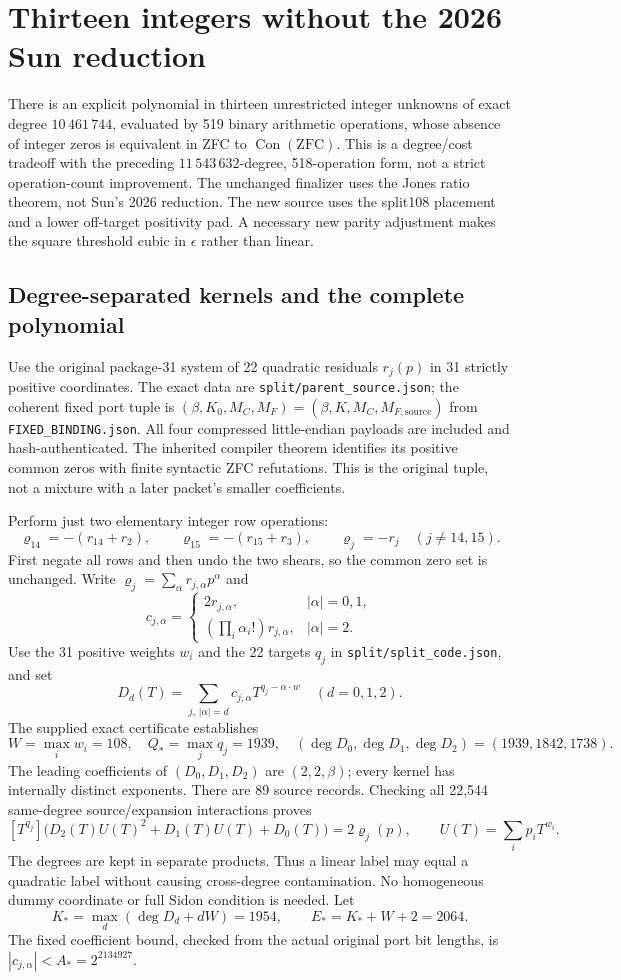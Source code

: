 \section{Thirteen integers without the 2026 Sun reduction}
There is an explicit polynomial in thirteen unrestricted integer unknowns of exact degree $10\,461\,744$, evaluated by 519 binary arithmetic operations, whose absence of integer zeros is equivalent in ZFC to $\operatorname{Con}(\mathrm{ZFC})$. This is a degree/cost tradeoff with the preceding $11\,543\,632$-degree, 518-operation form, not a strict operation-count improvement. The unchanged finalizer uses the Jones ratio theorem, not Sun's 2026 reduction. The new source uses the split108 placement and a lower off-target positivity pad. A necessary new parity adjustment makes the square threshold cubic in $\epsilon$ rather than linear.

\subsection{Degree-separated kernels and the complete polynomial}
Use the original package-31 system of 22 quadratic residuals
$r_j(p)$ in 31 strictly positive coordinates. The exact data are
\texttt{split/parent\_source.json}; the coherent fixed port tuple is
$(\beta,K_0,M_C,M_F)=(\beta,K,M_C,M_{F,\mathrm{source}})$ from
\texttt{FIXED\_BINDING.json}. All four compressed little-endian payloads are
included and hash-authenticated. The inherited compiler theorem identifies
its positive common zeros with finite syntactic ZFC refutations. This is the
original tuple, not a mixture with a later packet's smaller coefficients.

Perform just two elementary integer row operations:
\[
 \varrho_{14}=-(r_{14}+r_2),\qquad
 \varrho_{15}=-(r_{15}+r_3),\qquad \varrho_j=-r_j\quad(j\ne14,15).
\]
First negate all rows and then undo the two shears, so the common zero set is
unchanged. Write $\varrho_j=\sum_\alpha r_{j,\alpha}p^\alpha$ and
\[
 c_{j,\alpha}=\begin{cases}
 2r_{j,\alpha},&|\alpha|=0,1,\\
 (\prod_i\alpha_i!)r_{j,\alpha},&|\alpha|=2.
 \end{cases}
\]
Use the 31 positive weights $w_i$ and the 22 targets $q_j$ in
\texttt{split/split\_code.json}, and set
\[
 D_d(T)=\sum_{j,\,|\alpha|=d}c_{j,\alpha}T^{q_j-\alpha\cdot w}
 \quad(d=0,1,2).
\]
The supplied exact certificate establishes
\[
 W=\max_iw_i=108,\quad Q_*=\max_jq_j=1939,\quad
 (\deg D_0,\deg D_1,\deg D_2)=(1939,1842,1738).
\]
The leading coefficients of $(D_0,D_1,D_2)$ are $(2,2,\beta)$; every kernel has internally
distinct exponents. There are 89 source records. Checking all 22,544
same-degree source/expansion interactions proves
\[
 [T^{q_j}]\bigl(D_2(T)U(T)^2+D_1(T)U(T)+D_0(T)\bigr)
 =2\varrho_j(p),\qquad U(T)=\sum_i p_iT^{w_i}.
\]
The degrees are kept in separate products. Thus a linear label may equal a
quadratic label without causing cross-degree contamination. No homogeneous
dummy coordinate or full Sidon condition is needed. Let
\[
 K_*=\max_d(\deg D_d+dW)=1954,\qquad E_*=K_*+W+2=2064.
\]
The fixed coefficient bound, checked from the actual original port bit
lengths, is $|c_{j,\alpha}|<A_*=2^{2134927}$.

